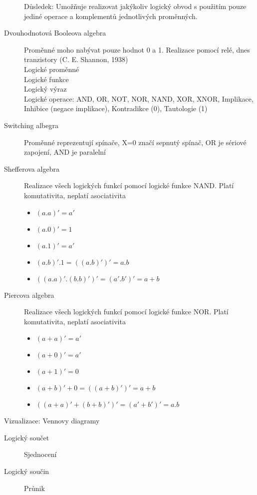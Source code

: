 \documentclass[a4wide]{report}
\begin{document}
\begin{description}
			Důsledek: Umožňuje realizovat jakýkoliv logický obvod s použitím pouze jediné operace a komplementů jednotlivých proměnných.
	\item[Dvouhodnotová Booleova algebra] Proměnné moho nabývat pouze hodnot 0 a 1. Realizace pomocí relé, dnes tranzistory (C. E. Shannon, 1938)\\
		Logické proměnné\\
		Logické funkce\\
		Logický výraz\\
		Logické operace: AND, OR, NOT, NOR, NAND, XOR, XNOR, Implikace, Inhibice (negace implikace), Kontradikce (0), Tautologie (1)
	\item[Switching albegra] Proměnné reprezentují spínače, X=0 značí sepnutý spínač, OR je sériové zapojení, AND je paralelní
	\item[Shefferova algebra] Realizace všech logických funkcí pomocí logické funkce NAND. Platí komutativita, neplatí asociativita
		\begin{itemize}
			\item $(a.a)' = a'$
			\item $(a.0)' = 1$
			\item $(a.1)' = a'$
			\item $(a.b)'.1 = ((a.b)')' = a . b$
			\item $((a.a)'.(b.b)')' = (a'.b')' = a + b$
		\end{itemize}
	\item[Piercova algebra] Realizace všech logických funkcí pomocí logické funkce NOR. Platí komutativita, neplatí asociativita
		\begin{itemize}
			\item $(a+a)' = a'$
			\item $(a+0)' = a'$
			\item $(a+1)' = 0$
			\item $(a+b)'+0 = ((a+b)')' = a + b$
			\item $((a+a)'+(b+b)')' = (a'+b')' = a . b$
		\end{itemize}
\end{description}


Vizualizace: Vennovy diagramy
\begin{description}
	\item[Logický součet] Sjednocení
	\item[Logický součin] Průnik
\end{description}
\end{document}
